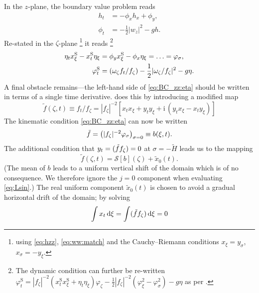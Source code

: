 \documentclass[a4paper,12pt]{article}
\newcommand{\mr}{\mathrm}
\newcommand{\mc}{\mathcal}
\renewcommand{\S}{^\mr{S}}
\newcommand{\ii}{\mr{i}\,}
\renewcommand{\_}[1]{_\mr{#1}}
\let\Re\relax
\let\Im\relax
\DeclareMathOperator\Re{Re}
\DeclareMathOperator\Im{Im}
\newcommand{\rbr}[1]{\left(#1\right)}
\newcommand{\z}{z}
\newcommand{\x}{x}
\newcommand{\y}{y}
\newcommand{\zz}{\zeta}
\newcommand{\xx}{\xi}
\newcommand{\yy}{\sigma}
\newcommand{\zmap}{f}
\newcommand{\ww}{\omega}
\newcommand{\Hzz}{\tilde H}
\newcommand{\hzz}{\eta}
\newcommand{\Lsin}{\mc S}
\newcommand{\xS}{\x\S}
\newcommand{\tf}{\tilde \zmap}
\begin{document}
In the $\z$-plane, the boundary value problem reads 
\begin{align*}
h_t &=- \phi_x h_x+\phi_y,\\
\phi_t &=- \frac12|w_\z|^2-gh.
\end{align*}
Re-stated in the $\zz$-plane%
\footnote{using \eqref{eq:hzz}, \eqref{eq:ww:match} and the Cauchy--Riemann conditions $x_\xx = y_\yy$, $x_\yy=-y_\xx$.}
 it reads%
 \footnote{The dynamic condition can further be re-written
$\varphi\S_t = |\zmap_\zz|^{-2} (\xS_t\xS_\xx + \hzz_t\hzz_\xx)\varphi_\zz - \frac12 |\zmap_\zz|^{-2} \rbr{\varphi_\xx^2-\varphi_\yy^2}  - g \hzz$ as per \citet{chalikov2005modeling}.} 
\begin{subequations}
\begin{align}
\hzz_t\xS_\xx - \xS_t\hzz_\xx &= \phi_\y\xS_\xx-\phi_\x\hzz_\xx = \ldots = \varphi_\yy, \label{eq:BC_zz:eta} \\
\varphi\S_t &= \Re(\ww_\zz f_t/ f_\zz)  - \frac12 |\ww_\zz/ f_\zz|^2  - g \hzz.\label{eq:BC_zz:phi}
\end{align}%
\label{eq:BC_zz}%
\end{subequations}%
A final obstacle remains---the left-hand side of \eqref{eq:BC_zz:eta} should be written in terms of a single time derivative.
\citet{chalikov2005modeling} does this by introducing a modified map
\begin{equation}
\tf(\zz,t)\equiv\zmap_t/\zmap_\zz = |\zmap_\zz|^{-2}[\x_t\x_\xx + \y_t\y_\xx +\ii(\y_t\x_\xx - \x_t\y_\xx ) ]
\label{eq:tf}
\end{equation}
The kinematic condition \eqref{eq:BC_zz:eta} can now be written
\begin{equation}
\Im \tf = \big(|\zmap_\zz|^{-2}\varphi_\yy\big)_{\yy=0} \equiv b(\xx,t).
\label{eq:BC_zz2:eta}%
\end{equation}%
The additional condition that $\y_t=\Im(\tf\zmap_\zz)=0$ at $\yy=-\Hzz$ leads us to the mapping
\begin{equation}
\tf(\zz,t) = \Lsin[b](\zz) + \tilde x_{0}(t).
\label{eq:tfMap}
\end{equation}
(The mean of $b$ leads to a uniform vertical shift of the domain which is of no consequence. We therefore ignore the $j=0$ component when evaluating \eqref{eq:Lsin}.)
The real uniform component $\tilde x_{0}(t)$ is chosen to avoid a gradual horizontal drift of the domain; 
by solving 
\[\int x_t\,\mr d\xx=\int\Re(\tf \zmap_\zz) \,\mr d \xx = 0\]
\end{document}
